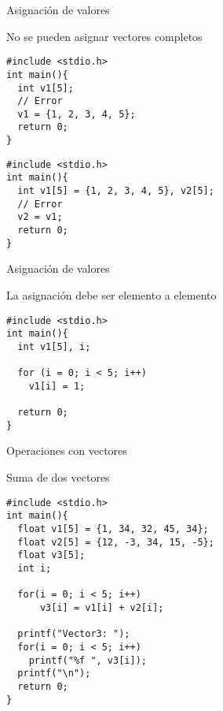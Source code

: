 \documentclass[xcolor={usenames,svgnames,dvipsnames}, aspectratio=169]{beamer}
\begin{document}
\begin{frame}[label={sec:org20f7960},fragile]{Asignación de valores}
 \begin{block}{No se pueden asignar vectores completos}
\lstset{language=C,label= ,caption= ,captionpos=b,numbers=none}
\begin{lstlisting}
#include <stdio.h>
int main(){
  int v1[5];
  // Error
  v1 = {1, 2, 3, 4, 5};
  return 0;
}

\end{lstlisting}

\lstset{language=C,label= ,caption= ,captionpos=b,numbers=none}
\begin{lstlisting}
#include <stdio.h>
int main(){
  int v1[5] = {1, 2, 3, 4, 5}, v2[5];
  // Error
  v2 = v1;
  return 0;
}

\end{lstlisting}
\end{block}
\end{frame}


\begin{frame}[label={sec:orgdc2eaaa},fragile]{Asignación de valores}
 \begin{block}{La asignación debe ser elemento a elemento}
\lstset{language=C,label= ,caption= ,captionpos=b,numbers=none}
\begin{lstlisting}
#include <stdio.h>
int main(){
  int v1[5], i;

  for (i = 0; i < 5; i++)
    v1[i] = 1;
  
  return 0;
}

\end{lstlisting}
\end{block}
\end{frame}

\begin{frame}[label={sec:orgb77a67d},fragile]{Operaciones con vectores}
 \begin{block}{Suma de dos vectores}
\lstset{language=C,label= ,caption= ,captionpos=b,numbers=none}
\begin{lstlisting}
#include <stdio.h>
int main(){
  float v1[5] = {1, 34, 32, 45, 34};
  float v2[5] = {12, -3, 34, 15, -5};
  float v3[5];
  int i;
  
  for(i = 0; i < 5; i++)
      v3[i] = v1[i] + v2[i];

  printf("Vector3: ");
  for(i = 0; i < 5; i++)
    printf("%f ", v3[i]);
  printf("\n");
  return 0;
}
\end{lstlisting}
\end{block}
\end{frame}
\end{document}
